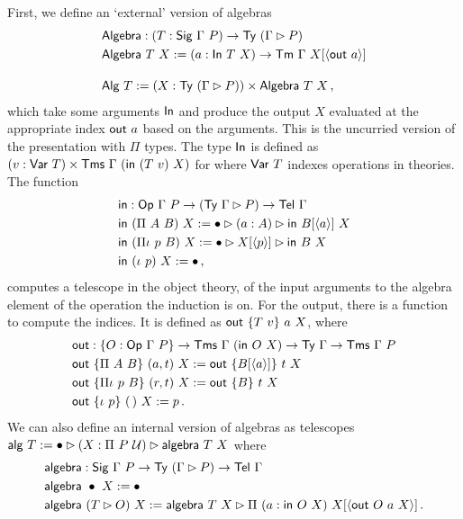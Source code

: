 First, we define an `external' version of algebras
\begin{align*}
    &\mta{Algebra} : (T : \mta{Sig}\ \Gamma\ P) \to \Ty\ (\Gamma \rhd P) \\
    &\mta{Algebra}\ T\ X := (a : \mta{In}\ T\ X) \to \Tm\ \Gamma\ X[\Msub{\mta{out}\ a}] \\[1em]
    &\mta{Alg}\ T := (X : \Ty\ (\Gamma \rhd P)) \times \mta{Algebra}\ T\ X \,,
\end{align*}
which take some arguments $\textsf{In}$ and produce the output $X$
evaluated at the appropriate index $\mta{out}\ a$ based on the arguments.
This is the uncurried version of the presentation with $\Pi$ types.
The type $\textsf{In}$ is defined as $(v : \textsf{Var}\ T) \times \textsf{Tms}\ \Gamma\
(\textsf{in}\ (T\ v)\ X)$ for where $\textsf{Var}\ T$ indexes
operations in theories. The function
\begin{align*}
    &\mta{in} : \mta{Op}\ \Gamma\ P \to (\Ty\ \Gamma \rhd P) \to \Tel\ \Gamma \\
    &\mta{in}\ (\Pi\ A\ B)\ X := \bullet \rhd (a : A) \rhd \mta{in}\ B[\Msub a]\ X \\
    &\mta{in}\ (\Pi\iota\ p\ B)\ X := \bullet \rhd X[\Msub p] \rhd \mta{in}\ B\ X \\
    &\mta{in}\ (\iota\ p)\ X := \bullet \,,
\end{align*}
computes a telescope in the object theory, of the input arguments to the algebra
element of the operation the induction is on. For the output, there is a function to compute
the indices. It is defined as $\textsf{out}\ \{T\ v\}\ a\ X$, where
\begin{align*}
    &\mta{out} : \{O : \Op\ \Gamma\ P\} \to \Tms\ \Gamma\ (\mta{in}\ O\ X) \to \Ty\ \Gamma \to \Tms\ \Gamma\ P \\
    &\mta{out}\ \{\Pi\ A\ B\}\ (a, t)\ X := \mta{out}\ \{B[\Msub a]\}\ t\ X \\
    &\mta{out}\ \{\Pi\iota\ p\ B\}\ (r, t)\ X := \mta{out}\ \{B\}\ t\ X \\
    &\mta{out}\ \{\iota\ p\}\ (\,)\ X := p \,.
\end{align*}
We can also define an internal version of algebras as telescopes
$\textsf{alg}\ T := \bullet \rhd (X : \Pi\ P\ \mathcal{U}) \rhd \textsf{algebra}\ T\ X$ where
\begin{align*}
    &\mta{algebra} : \mta{Sig}\ \Gamma\ P \to \Ty\ (\Gamma \rhd P) \to \Tel\ \Gamma \\
    &\mta{algebra}\ \bullet\ X := \bullet \\
    &\mta{algebra}\ (T \rhd O)\ X := \mta{algebra}\ T\ X \rhd \Pi\ (a : \mta{in}\ O\ X)\ X[\Msub{\mta{out}\ O\ a\ X}] \,.
\end{align*}

